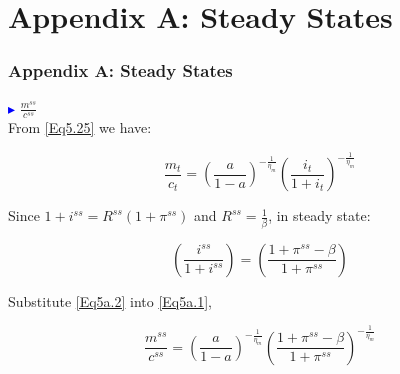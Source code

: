 \renewcommand{\theequation}{A.\arabic{equation}}
\setcounter{equation}{0}

\section{Appendix A: Steady States}

\begin{frame}
\frametitle{Appendix A: Steady States} \vskip 0.1in

\textcolor{blue}{$\blacktriangleright$} $\frac{m^{ss}}{c^{ss}}$\\

From \eqref{Eq5.25} we have:

\begin{equation}\label{Eq5a.1}
\frac{m_{t}}{c_{t}} = (\frac{a}{1-a})^{-\frac{1}{\eta_{m}}}
(\frac{i_{t}}{1+i_{t}})^{-\frac{1}{\eta_{m}}}
\end{equation}

Since $1+i^{ss}=R^{ss}(1+\pi^{ss})$ and $R^{ss}=\frac{1}{\beta}$, in
steady state:

\begin{equation}\label{Eq5a.2}
(\frac{i^{ss}}{1+i^{ss}})= (\frac{1+\pi^{ss}-\beta}{1+\pi^{ss}})
\end{equation}

Substitute \eqref{Eq5a.2} into \eqref{Eq5a.1},

\begin{equation}\label{Eq5a.3}
\frac{m^{ss}}{c^{ss}} = (\frac{a}{1-a})^{-\frac{1}{\eta_{m}}}
(\frac{1+\pi^{ss}-\beta}{1+\pi^{ss}})^{-\frac{1}{\eta_{m}}}
\end{equation}

\end{frame}



